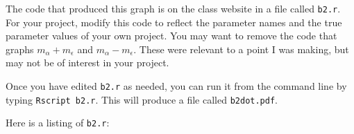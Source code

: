 \documentclass[11pt]{article}
\begin{document}
The code that produced this graph is on the class website in a file
called \texttt{b2.r}. For your project, modify this code to reflect
the parameter names and the true parameter values of your own
project. You may want to remove the code that graphs $m_\alpha +
m_\epsilon$ and $m_\alpha - m_\epsilon$. These were relevant to a
point I was making, but may not be of interest in your project.

Once you have edited \texttt{b2.r} as needed, you can run it from the
command line by typing \texttt{Rscript b2.r}. This will produce a file
called \texttt{b2dot.pdf}.

Here is a listing of \texttt{b2.r}:


\printbibliography
\end{document}
